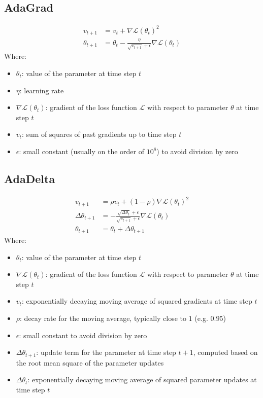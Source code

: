\documentclass[a4paper]{article}
\newcommand{\ELL}{\mathcal{L}}
\begin{document}
\subsection*{AdaGrad}
\begin{align*}
    v_{t+1} &= v_t + \nabla\ELL(\theta_t)^2 \\
    \theta_{t+1} &= \theta_t - \frac{\eta}{\sqrt{v_{t+1}}+\epsilon} \nabla\ELL(\theta_t)
\end{align*}
Where:
\begin{itemize}
    \item $\theta_t$: value of the parameter at time step $t$
    \item $\eta$: learning rate
    \item $\nabla\ELL(\theta_t)$: gradient of the loss function $\ELL$ with respect to parameter $\theta$ at time step $t$
    \item $v_t$: sum of squares of past gradients up to time step $t$
    \item $\epsilon$: small constant (usually on the order of $10^8$) to avoid division by zero
\end{itemize}

\subsection*{AdaDelta}
\begin{align*}
    v_{t+1} &= \rho v_t + (1-\rho)\nabla\ELL(\theta_t)^2 \\
    \Delta\theta_{t+1} &= -\frac{\sqrt{\Delta\theta_t}+\epsilon}{\sqrt{v_{t+1}}+\epsilon} \nabla\ELL(\theta_t) \\
    \theta_{t+1} &= \theta_t + \Delta\theta_{t+1}
\end{align*}
Where:
\begin{itemize}
    \item $\theta_t$: value of the parameter at time step $t$
    \item $\nabla\ELL(\theta_t)$: gradient of the loss function $\ELL$ with respect to parameter $\theta$ at time step $t$
    \item $v_t$: exponentially decaying moving average of squared gradients at time step $t$
    \item $\rho$: decay rate for the moving average, typically close to $1$ (e.g. $0.95$)
    \item $\epsilon$: small constant to avoid division by zero
    \item $\Delta\theta_{t+1}$: update term for the parameter at time step $t+1$, computed based on the root mean square of the parameter updates
    \item $\Delta\theta_{t}$: exponentially decaying moving average of squared parameter updates at time step $t$
\end{itemize}
\end{document}
